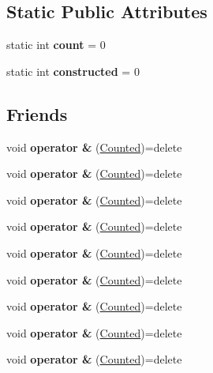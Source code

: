 \subsection*{Static Public Attributes}
\begin{DoxyCompactItemize}
\item 
\mbox{\label{struct_counted_accaeae5c389be2b05a614b2ae4bcf650}} 
static int {\bfseries count} = 0
\item 
\mbox{\label{struct_counted_ac7afd640dd6d42a83d15d6519866d457}} 
static int {\bfseries constructed} = 0
\end{DoxyCompactItemize}
\subsection*{Friends}
\begin{DoxyCompactItemize}
\item 
\mbox{\label{struct_counted_ae9ec4c76e4c79ec72043d1685a0e15c4}} 
void {\bfseries operator \&} (\mbox{\hyperlink{struct_counted}{Counted}})=delete
\item 
\mbox{\label{struct_counted_ae9ec4c76e4c79ec72043d1685a0e15c4}} 
void {\bfseries operator \&} (\mbox{\hyperlink{struct_counted}{Counted}})=delete
\item 
\mbox{\label{struct_counted_ae9ec4c76e4c79ec72043d1685a0e15c4}} 
void {\bfseries operator \&} (\mbox{\hyperlink{struct_counted}{Counted}})=delete
\item 
\mbox{\label{struct_counted_ae9ec4c76e4c79ec72043d1685a0e15c4}} 
void {\bfseries operator \&} (\mbox{\hyperlink{struct_counted}{Counted}})=delete
\item 
\mbox{\label{struct_counted_ae9ec4c76e4c79ec72043d1685a0e15c4}} 
void {\bfseries operator \&} (\mbox{\hyperlink{struct_counted}{Counted}})=delete
\item 
\mbox{\label{struct_counted_ae9ec4c76e4c79ec72043d1685a0e15c4}} 
void {\bfseries operator \&} (\mbox{\hyperlink{struct_counted}{Counted}})=delete
\item 
\mbox{\label{struct_counted_ae9ec4c76e4c79ec72043d1685a0e15c4}} 
void {\bfseries operator \&} (\mbox{\hyperlink{struct_counted}{Counted}})=delete
\item 
\mbox{\label{struct_counted_ae9ec4c76e4c79ec72043d1685a0e15c4}} 
void {\bfseries operator \&} (\mbox{\hyperlink{struct_counted}{Counted}})=delete
\item 
\mbox{\label{struct_counted_ae9ec4c76e4c79ec72043d1685a0e15c4}} 
void {\bfseries operator \&} (\mbox{\hyperlink{struct_counted}{Counted}})=delete
\end{DoxyCompactItemize}
